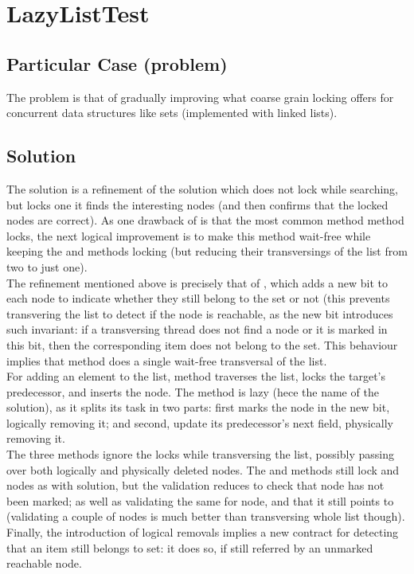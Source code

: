 \section{\textbf{LazyListTest}}

\subsection{Particular Case (problem)}
The problem is that of gradually improving what coarse grain locking
offers for concurrent data structures like sets (implemented with
linked lists).

\subsection{Solution}
The  solution is a refinement of the 
solution which does not lock while searching, but locks one it finds
the interesting nodes (and then confirms that the locked nodes are
correct). As one drawback of  is that the most
common method  method locks, the next logical improvement
is to make this method wait-free while keeping the  and
 methods locking (but reducing their transversings of the
list from two to just one). \\

The refinement mentioned above is precisely that of ,
which adds a new bit to each node to indicate whether they still
belong to the set or not (this prevents transvering the list to detect
if the node is reachable, as the new bit introduces such invariant: if
a transversing thread does not find a node or it is marked in this
bit, then the corresponding item does not belong to the set. This
behaviour implies that  method does a single wait-free
transversal of the list. \\

For adding an element to the list,  method traverses the list,
locks the target's predecessor, and inserts the node. The  
method is lazy (hece the name of the solution), as it splits its task in
two parts: first marks the node in the new bit, logically removing it;
and second, update its predecessor's next field, physically removing
it. \\

The three methods ignore the locks while transversing the list,
possibly passing over both logically and physically deleted nodes. The
 and  methods still lock  and  nodes
as with  solution, but the validation reduces to
check that  node has not been marked; as well as validating
the same for  node, and that it still points to 
(validating a couple of nodes is much better than transversing whole
list though). Finally, the introduction of logical removals implies a
new contract for detecting that an item still belongs to set: it does
so, if still referred by an unmarked reachable node. 


